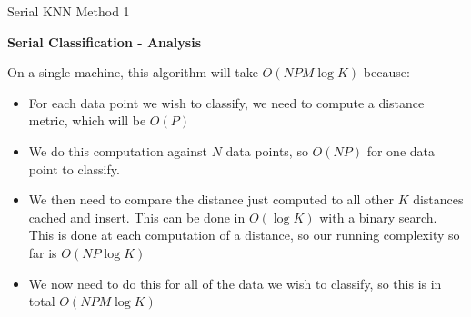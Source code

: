 \begin{algorithm}[ht!]
\DontPrintSemicolon
{}
\caption{Serial KNN Method 1\label{KNN1}}
\end{algorithm}

\newpage

\vspace{5 mm}
\noindent
\textbf{Serial Classification - Analysis}

\vspace{5 mm}
\noindent
On a single machine, this algorithm will take $O(N P M \log K)$ because:

\begin{itemize}
\item For each data point we wish to classify, we need to compute a distance 
metric, which will be $O(P)$
\item We do this computation against $N$ data points, so $O(N P)$ for one data 
point to classify.
\item We then need to compare the distance just computed to all other $K$ 
distances cached and insert. This can be done in $O(\log K)$ with a binary 
search. This is done at each computation of a distance, so our running 
complexity so far is $O(N P \log K)$
\item We now need to do this for all of the data we wish to classify, so this 
is in total $O(N P M \log K)$
\end{itemize}

